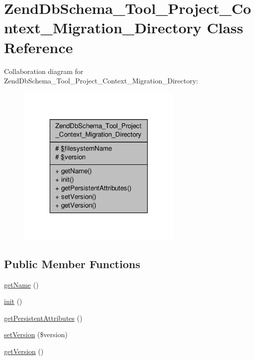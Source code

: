 \hypertarget{classZendDbSchema__Tool__Project__Context__Migration__Directory}{\section{Zend\-Db\-Schema\-\_\-\-Tool\-\_\-\-Project\-\_\-\-Context\-\_\-\-Migration\-\_\-\-Directory Class Reference}
\label{classZendDbSchema__Tool__Project__Context__Migration__Directory}
}


Collaboration diagram for Zend\-Db\-Schema\-\_\-\-Tool\-\_\-\-Project\-\_\-\-Context\-\_\-\-Migration\-\_\-\-Directory\-:\nopagebreak
\begin{figure}[H]
\begin{center}
\leavevmode
\includegraphics[width=226pt]{classZendDbSchema__Tool__Project__Context__Migration__Directory__coll__graph}
\end{center}
\end{figure}
\subsection*{Public Member Functions}
\begin{DoxyCompactItemize}
\item 
\hyperlink{classZendDbSchema__Tool__Project__Context__Migration__Directory_a2365b3a467489206406ec6123bddb301}{get\-Name} ()
\item 
\hyperlink{classZendDbSchema__Tool__Project__Context__Migration__Directory_adc340a1246adc9051ddaf577cdf2d98b}{init} ()
\item 
\hyperlink{classZendDbSchema__Tool__Project__Context__Migration__Directory_a8d8f5a5f33ede8a65548650bea56f999}{get\-Persistent\-Attributes} ()
\item 
\hyperlink{classZendDbSchema__Tool__Project__Context__Migration__Directory_ad7af044bf3098d97a0fb978e358946e0}{set\-Version} (\$version)
\item 
\hyperlink{classZendDbSchema__Tool__Project__Context__Migration__Directory_a142d2626f9d58cdb451a135092788d3c}{get\-Version} ()
\end{DoxyCompactItemize}
